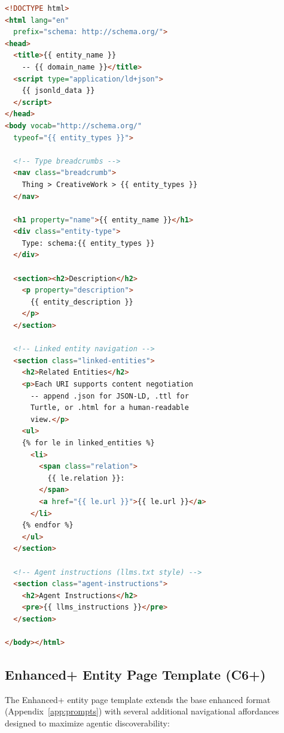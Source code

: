\documentclass[runningheads]{llncs}
\begin{document}
\begin{lstlisting}[basicstyle=\small\ttfamily,breaklines=true,frame=single,
  language=HTML]
<!DOCTYPE html>
<html lang="en"
  prefix="schema: http://schema.org/">
<head>
  <title>{{ entity_name }}
    -- {{ domain_name }}</title>
  <script type="application/ld+json">
    {{ jsonld_data }}
  </script>
</head>
<body vocab="http://schema.org/"
  typeof="{{ entity_types }}">

  <!-- Type breadcrumbs -->
  <nav class="breadcrumb">
    Thing > CreativeWork > {{ entity_types }}
  </nav>

  <h1 property="name">{{ entity_name }}</h1>
  <div class="entity-type">
    Type: schema:{{ entity_types }}
  </div>

  <section><h2>Description</h2>
    <p property="description">
      {{ entity_description }}
    </p>
  </section>

  <!-- Linked entity navigation -->
  <section class="linked-entities">
    <h2>Related Entities</h2>
    <p>Each URI supports content negotiation
      -- append .json for JSON-LD, .ttl for
      Turtle, or .html for a human-readable
      view.</p>
    <ul>
    {% for le in linked_entities %}
      <li>
        <span class="relation">
          {{ le.relation }}:
        </span>
        <a href="{{ le.url }}">{{ le.url }}</a>
      </li>
    {% endfor %}
    </ul>
  </section>

  <!-- Agent instructions (llms.txt style) -->
  <section class="agent-instructions">
    <h2>Agent Instructions</h2>
    <pre>{{ llms_instructions }}</pre>
  </section>

</body></html>
\end{lstlisting}

\subsection{Enhanced+ Entity Page Template (C6+)}
\label{app:enhanced_plus}

The Enhanced+ entity page template extends the base enhanced format
(Appendix~\ref{app:prompts}) with several additional navigational
affordances designed to maximize agentic discoverability:
\end{document}
